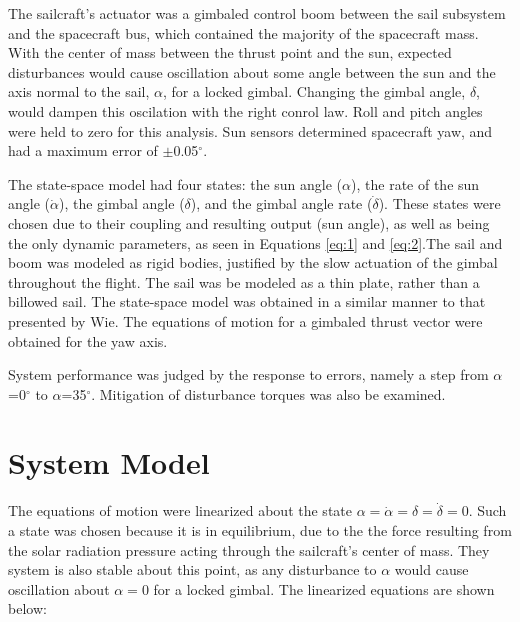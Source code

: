 \documentclass[]{aiaa-tc}%
\begin{document}
	\vspace{5 mm}
	
The sailcraft's actuator was a gimbaled control boom between the sail subsystem and the spacecraft bus, which contained the majority of the spacecraft mass.  With the center of mass between the thrust point and the sun, expected disturbances would cause oscillation about some angle between the sun and the axis normal to the sail, $\alpha$, for a locked gimbal.  Changing the gimbal angle, $\delta$, would dampen this oscilation with the right conrol law. Roll and pitch angles were held to zero for this analysis. Sun sensors determined spacecraft yaw, and had a maximum error of $\pm$0.05$^{\circ}$.
	
	\vspace{5 mm}

The state-space model had four states: the sun angle ($\alpha$), the rate of the sun angle ($\dot{\alpha}$), the gimbal angle ($\delta$), and the gimbal angle rate ($\dot{\delta}$). These states were chosen due to their coupling and resulting output (sun angle), as well as being the only dynamic parameters, as seen in Equations \ref{eq:1} and \ref{eq:2}.The sail and boom was modeled as rigid bodies, justified by the slow actuation of the gimbal throughout the flight. The sail was be modeled as a thin plate, rather than a billowed sail. The state-space model was obtained in a similar manner to that presented by Wie\cite{WieSolarSail2}. The equations of motion for a gimbaled thrust vector were obtained for the yaw axis. 
	
	\vspace{5 mm}

System performance was judged by the response to errors, namely a step from $\alpha$=0$^{\circ}$ to $\alpha$=35$^{\circ}$. Mitigation of disturbance torques was also be examined.

	\section{System Model}

	The equations of motion were linearized about the state $\alpha = \dot{\alpha} = \delta = \dot{\delta} =0$. Such a state was chosen because it is in equilibrium, due to the the force resulting from the solar radiation pressure acting through the sailcraft's center of mass. They system is also stable about this point, as any disturbance to $\alpha$ would cause oscillation about $\alpha=0$ for a locked gimbal. The linearized equations are shown below\cite{WieSolarSail2}:
\end{document}
